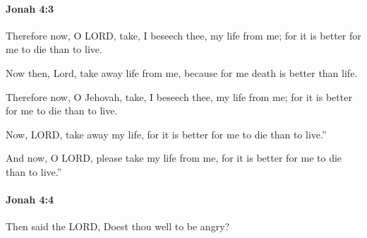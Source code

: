 		\paragraph{Jonah 4:3} %
			\label{JONAH-4-3}

			Therefore now, O LORD, take, I beseech thee, my life from me; for it is better for me to die than to live.

			\begin{versebox}
					\item[BHS] 
					\item[LXX] 
					\item[AB 1990 270] Now then, Lord, take away life from me, because for me death is better than life. 
					\item[ASV] Therefore now, O Jehovah, take, I beseech thee, my life from me; for it is better for me to die than to live.
					\item[NIV] Now, LORD, take away my life, for it is better for me to die than to live.”
					\item[NRSV] And now, O LORD, please take my life from me, for it is better for me to die than to live.”
			\end{versebox}

		\paragraph{Jonah 4:4} %
			\label{JONAH-4-4}

			Then said the LORD, Doest thou well to be angry?

